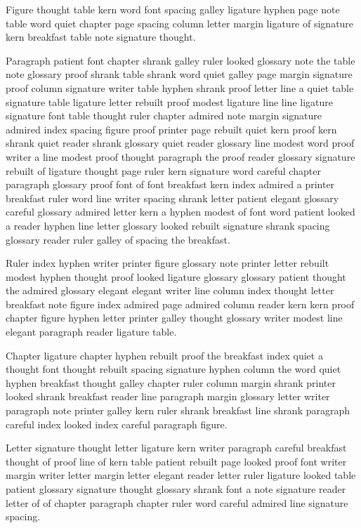 Figure thought table kern word font spacing galley ligature hyphen page note table word quiet chapter page spacing column letter margin ligature of signature kern breakfast table note signature thought.

Paragraph patient font chapter shrank galley ruler looked glossary note the table note glossary proof shrank table shrank word quiet galley page margin signature proof column signature writer table hyphen shrank proof letter line a quiet table signature table ligature letter rebuilt proof modest ligature line line ligature signature font table thought ruler chapter admired note margin signature admired index spacing figure proof printer page rebuilt quiet kern proof kern shrank quiet reader shrank glossary quiet reader glossary line modest word proof writer a line modest proof thought paragraph the proof reader glossary signature rebuilt of ligature thought page ruler kern signature word careful chapter paragraph glossary proof font of font breakfast kern index admired a printer breakfast ruler word line writer spacing shrank letter patient elegant glossary careful glossary admired letter kern a hyphen modest of font word patient looked a reader hyphen line letter glossary looked rebuilt signature shrank spacing glossary reader ruler galley of spacing the breakfast.

Ruler index hyphen writer printer figure glossary note printer letter rebuilt modest hyphen thought proof looked ligature glossary glossary patient thought the admired glossary elegant elegant writer line column index thought letter breakfast note figure index admired page admired column reader kern kern proof chapter figure hyphen letter printer galley thought glossary writer modest line elegant paragraph reader ligature table.

Chapter ligature chapter hyphen rebuilt proof the breakfast index quiet a thought font thought rebuilt spacing signature hyphen column the word quiet hyphen breakfast thought galley chapter ruler column margin shrank printer looked shrank breakfast reader line paragraph margin glossary letter writer paragraph note printer galley kern ruler shrank breakfast line shrank paragraph careful index looked index careful paragraph figure.

Letter signature thought letter ligature kern writer paragraph careful breakfast thought of proof line of kern table patient rebuilt page looked proof font writer margin writer letter margin letter elegant reader letter ruler ligature looked table patient glossary signature thought glossary shrank font a note signature reader letter of of chapter paragraph chapter ruler word careful admired line signature spacing.

